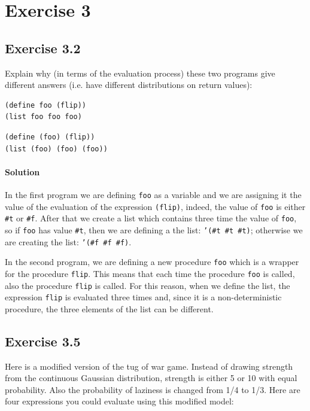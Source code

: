\section*{Exercise 3}

\subsection*{Exercise 3.2}
Explain why (in terms of the evaluation process) these two programs give different answers 
(i.e. have different distributions on return values):
\begin{lstlisting}
(define foo (flip))
(list foo foo foo)
\end{lstlisting}

\begin{lstlisting}
(define (foo) (flip))
(list (foo) (foo) (foo))
\end{lstlisting}    

\paragraph{Solution} 
In the first program we are defining \texttt{foo} as a variable and we are assigning it the value of the evaluation of the 
expression \texttt{(flip)}, indeed, the value of \texttt{foo} is either \texttt{\#t} or \texttt{\#f}.
After that we create a list which contains three time the value of \texttt{foo}, so if \texttt{foo} has value \texttt{\#t}, then
we are defining a the list: \texttt{'(\#t \#t \#t)}; otherwise we are creating the list: \texttt{'(\#f \#f \#f)}.

In the second program, we are defining a new procedure \texttt{foo} which is a wrapper for the procedure \texttt{flip}. This means
that each time the procedure \texttt{foo} is called, also the procedure \texttt{flip} is called.
For this reason, when we define the list, the expression \texttt{flip} is evaluated three times and, since it is a non-deterministic 
procedure, the three elements of the list can be different.


\subsection*{Exercise 3.5}
Here is a modified version of the tug of war game. Instead of drawing strength from the continuous Gaussian 
distribution, strength is either 5 or 10 with equal probability. Also the probability of laziness is changed from 1/4 to 1/3. 
Here are four expressions you could evaluate using this modified model:

